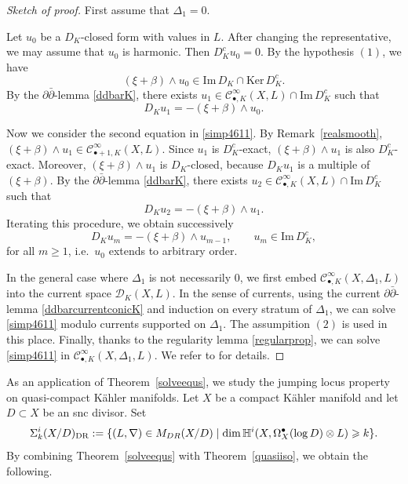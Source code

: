 \documentclass[english]{amsart}
\newcommand{\ddbar}{\partial\bar{\partial}}
\newcommand{\cC}{\mathcal{C}}
\newcommand{\im}{\mathrm{Im} \,}
\renewcommand{\ker}{\mathrm{Ker} \,}
\renewcommand{\ge}{\geqslant}
\numberwithin{equation}{thm}
\begin{document}
\begin{proof}[Sketch of proof]
	First assume that $\Delta_1=0$.
	
	Let $u_0$ be a $D_K$-closed form with values in $L$. After changing the representative, we may assume that $u_0$ is harmonic. Then $D_K^c u_0=0$.
	By the hypothesis $(1)$, we have
	\[
	(\xi+\beta)\wedge u_0 \in \im D_K \cap \ker D_K^c.
	\]
	By the $\ddbar$-lemma \ref{ddbarK}, there exists $u_1 \in \cC^\infty_{\bullet,K}(X,L)\cap \im D_K^c$ such that
	\begin{equation}\label{par3}
		D_K u_1 = -(\xi+\beta)\wedge u_0.
	\end{equation}
	
	Now we consider the second equation in \eqref{simp4611}.
	By Remark~\ref{realsmooth}, $(\xi+\beta)\wedge u_1 \in \cC^\infty_{\bullet+1,K}(X,L)$.
	Since $u_1$ is $D_K^c$-exact, $(\xi+\beta)\wedge u_1$ is also $D_K^c$-exact. Moreover, $(\xi+\beta)\wedge u_1$ is $D_K$-closed, because $D_K u_1$ is a multiple of $(\xi+\beta)$.
	By the $\ddbar$-lemma \ref{ddbarK}, there exists $u_2 \in \cC^\infty_{\bullet,K}(X,L)\cap \im D_K^c$ such that
	\begin{equation}\label{par8}
		D_K u_2 = -(\xi+\beta)\wedge u_1.
	\end{equation}
	Iterating this procedure, we obtain successively
	\[
	D_K u_m = -(\xi+\beta)\wedge u_{m-1}, \qquad u_m \in \im D_K^c,
	\]
	for all $m\ge 1$, i.e.\ $u_0$ extends to arbitrary order.
	
	\medskip
	
	In the general case where $\Delta_1$ is not necessarily $0$, we first embed $\cC^\infty_{\bullet,K}(X,\Delta_1,L)$ into the current space $\mathcal{D}_K (X,L)$. In the sense of currents, using the current $\ddbar$-lemma \ref{ddbarcurrentconicK} and induction on every stratum of $\Delta_1$, we can solve \eqref{simp4611} modulo currents supported on $\Delta_1$. The assumpition $(2)$ is used in this place. 
	Finally, thanks to the regularity lemma \ref{regularprop}, we can solve \eqref{simp4611} in $\cC^\infty_{\bullet,K}(X,\Delta_1,L)$. We refer to \cite[Section 10]{CDHP} for details.
\end{proof}

As an application of Theorem~\ref{solveequs}, we study the jumping locus property on quasi-compact K\"ahler manifolds. Let $X$ be a compact K\"ahler manifold and let $D\subset X$ be an snc divisor. Set
\[
\Sigma_k^i(X/D)_{\rm DR}
:= \{ (L,\nabla)\in M_{DR}(X/D) \mid \dim \mathbb H^i(X,\Omega_X^\bullet(\log D)\otimes L)\ge k\}.
\]
By combining Theorem~\ref{solveequs} with Theorem~\ref{quasiiso}, we obtain the following.
\end{document}
